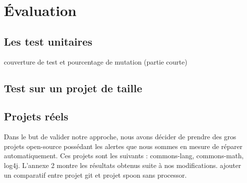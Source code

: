 \documentclass[a4paper]{article}
\begin{document}
\section{Évaluation}
\subsection{Les test unitaires}
couverture de test et pourcentage de mutation (partie courte)
\subsection{Test sur un projet de taille}
\subsection{Projets réels}
\par Dans le but de valider notre approche, nous avons décider de prendre des gros projets open-source possédant les alertes que nous sommes en mesure de réparer automatiquement. Ces projets sont les suivants : commons-lang, commons-math, log4j. L'annexe 2 montre les résultats obtenus suite à nos modifications. 
ajouter un comparatif entre projet git et projet spoon sans processor.
\end{document}
